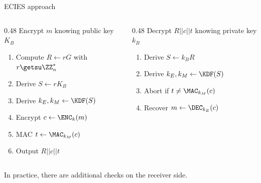 \begin{frame}{ECIES approach}
  \begin{columns}[t]
    \begin{column}{0.48\textwidth}
      Encrypt $m$ knowing public key $K_B$
      \begin{enumerate}[<+(1)->]
        \item Compute $R\gets rG$ with $r\getsu\ZZ_n^*$
        \item Derive $S\gets rK_B$
        \item Derive $k_E, k_M \gets \KDF(S)$
        \item Encrypt $c \gets \ENC_k(m)$
        \item MAC $t \gets \MAC_{k_M}(c)$
        \item Output $R||c||t$
      \end{enumerate}
    \end{column}
    \begin{column}{0.48\textwidth}
      \pause
      Decrypt $R||c||t$ knowing private key $k_B$
      \begin{enumerate}[<+(1)->]
        \item Derive $S\gets k_BR$
        \item Derive $k_E, k_M \gets \KDF(S)$
        \item Abort if $t \neq \MAC_{k_M}(c)$
        \item Recover $m \gets \DEC_{k_E}(c)$
      \end{enumerate}
    \end{column}
  \end{columns}

  \vspace*{1em}

  \pause
  In practice, there are additional checks on the receiver side.
\end{frame}


